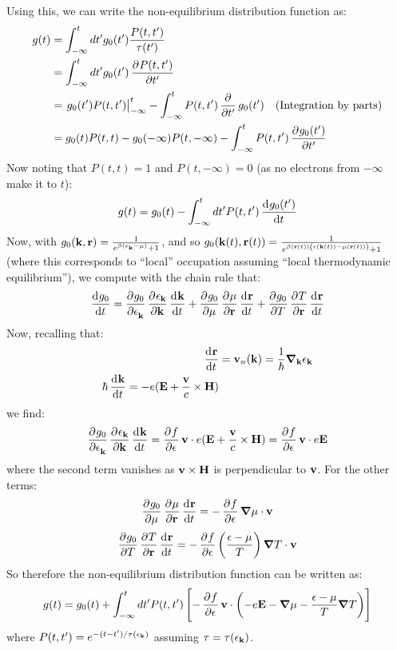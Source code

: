 Using this, we can write the non-equilibrium distribution function as:
\begin{equation}
    \begin{split}
        g(t) &= \int_{-\infty}^t dt' g_0(t')\frac{P(t, t')}{\tau(t')}
        \\ &= \int_{-\infty}^t dt' g_0(t')\dpd{P(t, t')}{t'}
        \\ &= \left.g_0(t')P(t, t')\right|_{-\infty}^t - \int_{-\infty}^t P(t, t') \dpd{}{t'}g_0(t') \quad \text{(Integration by parts)}
        \\ &= g_0(t)P(t, t) - g_{0}(-\infty)P(t, -\infty) - \int_{-\infty}^t P(t, t')\dpd{g_0(t')}{t'}
    \end{split}
\end{equation}
Now noting that $P(t, t) = 1$ and $P(t, -\infty) = 0$ (as no electrons from $-\infty$ make it to $t$):
\begin{equation}
    g(t) = g_0(t) - \int_{-\infty}^t dt' P(t, t')\dod{g_0(t')}{t}
\end{equation}
Now, with $g_0(\mathbf{k}, \mathbf{r}) = \frac{1}{e^{\beta(\epsilon_{\mathbf{k}} - \mu)} + 1}$, and so $g_0(\mathbf{k}(t), \mathbf{r}(t)) = \frac{1}{e^{\beta(\mathbf{r}(t))\left(\epsilon(\mathbf{k}(t)) - \mu(\mathbf{r}(t))\right)} + 1}$ (where this corresponds to ``local'' occupation assuming ``local thermodynamic equilibrium''), we compute with the chain rule that:
\begin{equation}
    \dod{g_0}{t} = \dpd{g_0}{\e_\v{k}}\dpd{\e_{\v{k}}}{\v{k}}\dod{\v{k}}{t} + \dpd{g_0}{\mu}\dpd{\mu}{\v{r}}\dod{\v{r}}{t} + \dpd{g_0}{T}\dpd{T}{\v{r}}\dod{\v{r}}{t}
\end{equation}
Now, recalling that:
\begin{equation}
    \begin{split}
        \dod{\v{r}}{t} &= \v{v}_n(\v{k}) = \frac{1}{\hbar}\nabla_\v{k}\e_\v{k}
        \\ \hbar\dod{\v{k}}{t} = -e(\v{E} + \frac{\v{v}}{c} \times \v{H})
    \end{split}
\end{equation}
we find:
\begin{equation}
    \dpd{g_0}{\e_\v{k}}\dpd{\e_{\v{k}}}{\v{k}}\dod{\v{k}}{t} = \dpd{f}{\e}\v{v} \cdot e(\v{E} + \frac{\v{v}}{c} \times \v{H}) = \dpd{f}{\e}\v{v} \cdot e\v{E}
\end{equation}
where the second term vanishes as $\mathbf{v} \times \mathbf{H}$ is perpendicular to $\mathbf{v}$. For the other terms:
\begin{equation}
    \dpd{g_0}{\mu}\dpd{\mu}{\v{r}}\dod{\v{r}}{t} = -\dpd{f}{\e}\nabla \mu \cdot \v{v}
\end{equation}
\begin{equation}
    \dpd{g_0}{T}\dpd{T}{\v{r}}\dod{\v{r}}{t} = -\dpd{f}{\e}\left(\frac{\e - \mu}{T}\right)\nabla T \cdot \v{v}
\end{equation}
So therefore the non-equilibrium distribution function can be written as:
\begin{equation}
    g(t) = g_0(t) + \int_{-\infty}^t dt'P(t, t')\left[-\dpd{f}{\e}\v{v} \cdot \left(-e\v{E} - \nabla \mu - \frac{\e - \mu}{T} \nabla T\right)\right]
\end{equation}
where $P(t, t') = e^{-(t-t')/\tau(\epsilon_{\mathbf{k}})}$ assuming $\tau = \tau(\epsilon_{\mathbf{k}})$. 


